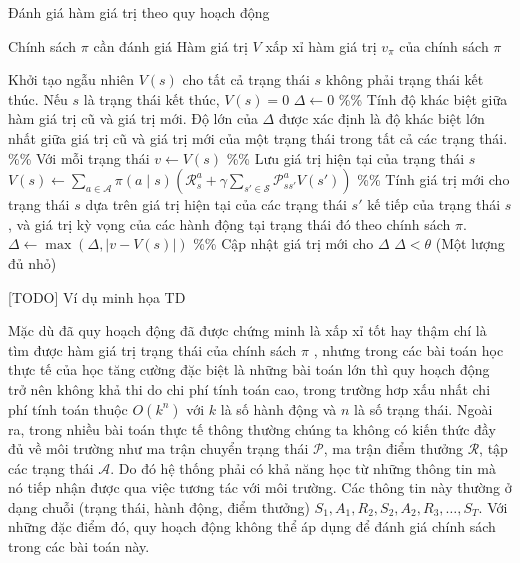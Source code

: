 		\begin{algorithm}
			\caption{Đánh giá hàm giá trị theo quy hoạch động}
			\label{alg_DP}
			\begin{algorithmic}[1]
				\renewcommand{\algorithmicrequire}{\textbf{Đầu vào:}}
				\renewcommand{\algorithmicensure}{\textbf{Đầu ra:}}
				\algnewcommand{}
				\algnewcommand\Operation{\item[\algorithmicoperation]}
				
				\Require Chính sách $\pi$ cần đánh giá
				\Ensure Hàm giá trị $V$ xấp xỉ hàm giá trị $v_{\pi}$ của chính sách $\pi$
				
				\Operation
				\State Khởi tạo ngẫu nhiên $V(s)$ cho tất cả trạng thái $s$ không phải trạng thái kết thúc. Nếu $s$ là trạng thái kết thúc, $V(s) = 0$
				\Repeat
				\State $\Delta \leftarrow 0$ \%\% Tính độ khác biệt giữa hàm giá trị cũ và giá trị mới. Độ lớn của $\Delta$ được xác định là độ khác biệt lớn nhất giữa giá trị cũ và giá trị mới của một trạng thái trong tất cả các trạng thái.
				 \%\% Với mỗi trạng thái
				\State $v \leftarrow  V(s)$ \%\% Lưu giá trị hiện tại của trạng thái $s$
				\State $V(s) \leftarrow \sum_{a \in \mathcal{A}}^{}\pi(a \mid s)(\mathcal{R}_{s}^{a} + \gamma \sum_{s' \in \mathcal{S}}^{}\mathcal{P}_{ss'}^{a}V(s'))$ \%\% Tính giá trị mới cho trạng thái $s$ dựa trên giá trị hiện tại của các trạng thái $s'$ kế tiếp của trạng thái $s$, và giá trị kỳ vọng của các hành động tại trạng thái đó theo chính sách $\pi$.
				\State $\Delta \leftarrow \max(\Delta, \left |v - V(s) \right |)$ \%\% Cập nhật giá trị mới cho $\Delta$
				\EndFor
				\Until $\Delta < \theta$ (Một lượng đủ nhỏ) 
			\end{algorithmic}
		\end{algorithm}
		
		[TODO] Ví dụ minh họa TD
		
		Mặc dù đã quy hoạch động đã được chứng minh là xấp xỉ tốt hay thậm chí là tìm được hàm giá trị trạng thái của chính sách $\pi$ \cite{gordon1995stable}, nhưng trong các bài toán học thực tế của học tăng cường đặc biệt là những bài toán lớn thì quy hoạch động trở nên không khả thi do chi phí tính toán cao, trong trường hơp xấu nhất chi phí tính toán thuộc $O(k^{n})$ với $k$ là số hành động và $n$ là số trạng thái. Ngoài ra, trong nhiều bài toán thực tế thông thường chúng ta không có kiến thức đầy đủ về môi trường như ma trận chuyển trạng thái $\mathcal{P}$, ma trận điểm thưởng $\mathcal{R}$, tập các trạng thái $\mathcal{A}$. Do đó hệ thống phải có khả năng học từ những thông tin mà nó tiếp nhận được qua việc tương tác với môi trường. Các thông tin này thường ở dạng chuỗi (trạng thái, hành động, điểm thưởng)
		$\mathit{S}_1, \mathit{A}_1, \mathit{R}_2, \mathit{S}_2, \mathit{A}_2, \mathit{R}_3, \dots, \mathit{S}_T$. Với những đặc điểm đó, quy hoạch động không thể áp dụng để đánh giá chính sách trong các bài toán này.
		 
